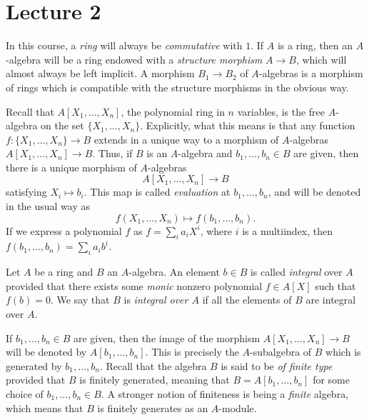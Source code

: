 \section{Lecture 2}

In this course, a \emph{ring} will always be \emph{commutative} with $1$.
If $A$ is a ring, then an $A$-algebra will be a ring endowed with a \emph{structure morphism} $A \to B$, which will almost always be left implicit.
A morphism $B_{1} \to B_{2}$ of $A$-algebras is a morphism of rings which is compatible with the structure morphisms in the obvious way.

Recall that $A[X_{1},\ldots,X_{n}]$, the polynomial ring in $n$ variables, is the free $A$-algebra on the set $\{X_{1},\ldots,X_{n}\}$.
Explicitly, what this means is that any function $f : \{X_1,\ldots,X_n\} \to B$ extends in a unique way to a morphism of $A$-algebras $A[X_1,\ldots,X_n] \to B$.
Thus, if $B$ is an $A$-algebra and $b_{1},\ldots,b_{n} \in B$ are given, then there is a unique morphism of $A$-algebras
\[ A[X_{1},\ldots,X_{n}] \to B \]
satisfying $X_{i} \mapsto b_{i}$.
This map is called \emph{evaluation} at $b_{1},\ldots,b_{n}$, and will be denoted in the usual way as
\[ f(X_{1},\ldots,X_{n}) \mapsto f(b_{1},\ldots,b_{n}). \]
If we express a polynomial $f$ as $f = \sum_{i} a_i X^i$, where $i$ is a multiindex, then $f(b_1,\ldots,b_n) = \sum_i a_i b^i$.


\begin{definition}
  Let $A$ be a ring and $B$ an $A$-algebra.
  An element $b \in B$ is called \emph{integral} over $A$ provided that there exists some \emph{monic} nonzero polynomial $f \in A[X]$ such that $f(b) = 0$.
  We say that $B$ is \emph{integral over $A$} if all the elements of $B$ are integral over $A$.
\end{definition}

If $b_{1},\ldots,b_{n} \in B$ are given, then the image of the morphism $A[X_{1},\ldots,X_{n}] \to B$ will be denoted by $A[b_{1},\ldots,b_{n}]$.
This is precisely the $A$-subalgebra of $B$ which is generated by $b_{1},\ldots,b_{n}$.
Recall that the algebra $B$ is said to be \emph{of finite type} provided that $B$ is finitely generated, meaning that $B = A[b_{1},\ldots,b_{n}]$ for some choice of $b_{1},\ldots,b_{n} \in B$.
A stronger notion of finiteness is being a \emph{finite} algebra, which means that $B$ is finitely generates as an $A$-module.

